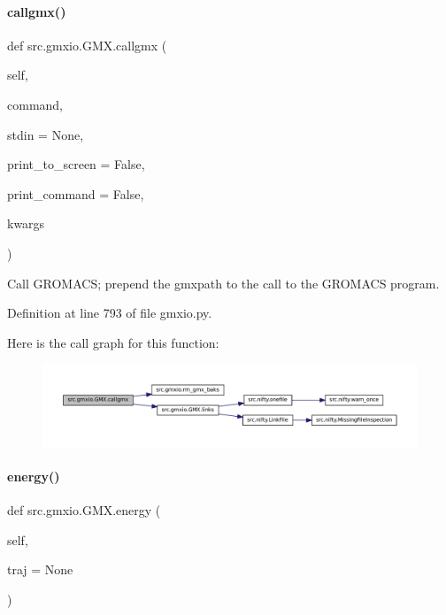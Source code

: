 \paragraph{\texorpdfstring{callgmx()}{callgmx()}}
{\footnotesize\ttfamily def src.\+gmxio.\+G\+M\+X.\+callgmx (\begin{DoxyParamCaption}\item[{}]{self,  }\item[{}]{command,  }\item[{}]{stdin = {\ttfamily None},  }\item[{}]{print\+\_\+to\+\_\+screen = {\ttfamily False},  }\item[{}]{print\+\_\+command = {\ttfamily False},  }\item[{}]{kwargs }\end{DoxyParamCaption})}



Call G\+R\+O\+M\+A\+CS; prepend the gmxpath to the call to the G\+R\+O\+M\+A\+CS program. 



Definition at line 793 of file gmxio.\+py.

Here is the call graph for this function\+:
\nopagebreak
\begin{figure}[H]
\begin{center}
\leavevmode
\includegraphics[width=350pt]{classsrc_1_1gmxio_1_1GMX_a9cd8a8dde96ee479107dd2933922235d_cgraph}
\end{center}
\end{figure}
\mbox{\label{classsrc_1_1gmxio_1_1GMX_ab777a6e6ad8f1cfb8b7d3f5ced60838e}} 
\paragraph{\texorpdfstring{energy()}{energy()}}
{\footnotesize\ttfamily def src.\+gmxio.\+G\+M\+X.\+energy (\begin{DoxyParamCaption}\item[{}]{self,  }\item[{}]{traj = {\ttfamily None} }\end{DoxyParamCaption})}



